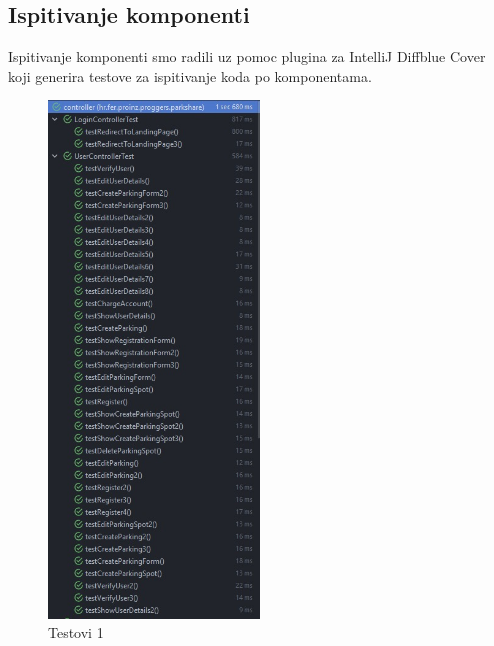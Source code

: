 			\subsection{Ispitivanje komponenti}
			Ispitivanje komponenti smo radili uz pomoc plugina za IntelliJ Diffblue Cover koji generira testove za ispitivanje koda po komponentama.
			\begin{figure}[H]
				
				\includegraphics[width=0.5\textwidth]{slike/testovi1.jpeg} %
				\centering
				\caption{Testovi 1}
				\label{fig:testovi1}
			\end{figure}
